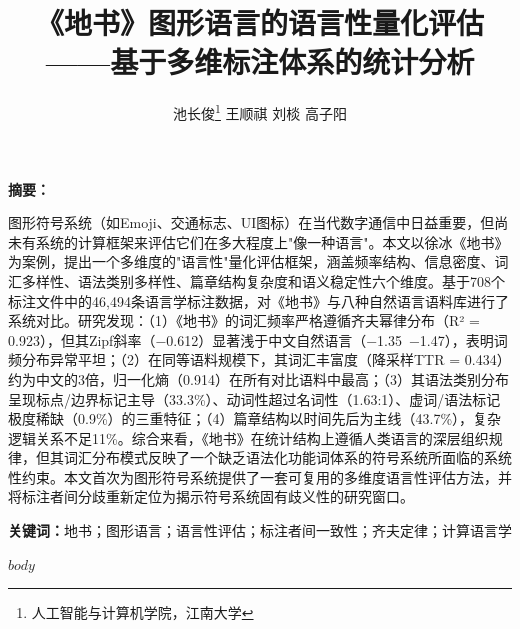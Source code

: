 \documentclass[12pt,a4paper,UTF8]{ctexart}
\title{\textbf{《地书》图形语言的语言性量化评估\\——基于多维标注体系的统计分析}}
\author{池长俊\thanks{人工智能与计算机学院，江南大学} \quad 王顺祺 \quad 刘棪 \quad 高子阳}
\date{}
\newenvironment{chineseabstract}{%
  \begin{center}
    \begin{minipage}{0.9\textwidth}
      \small
      \textbf{摘\quad 要：}
}{%
    \end{minipage}
  \end{center}
  \vspace{0.5em}
}
\newcommand{\keywords}[1]{%
  \begin{center}
    \begin{minipage}{0.9\textwidth}
      \small
      \textbf{关键词：}#1
    \end{minipage}
  \end{center}
}
\begin{document}
\maketitle

\begin{chineseabstract}
图形符号系统（如Emoji、交通标志、UI图标）在当代数字通信中日益重要，但尚未有系统的计算框架来评估它们在多大程度上"像一种语言"。本文以徐冰《地书》为案例，提出一个多维度的"语言性"量化评估框架，涵盖频率结构、信息密度、词汇多样性、语法类别多样性、篇章结构复杂度和语义稳定性六个维度。基于708个标注文件中的46,494条语言学标注数据，对《地书》与八种自然语言语料库进行了系统对比。研究发现：（1）《地书》的词汇频率严格遵循齐夫幂律分布（R² = 0.923），但其Zipf斜率（−0.612）显著浅于中文自然语言（−1.35~−1.47），表明词频分布异常平坦；（2）在同等语料规模下，其词汇丰富度（降采样TTR = 0.434）约为中文的3倍，归一化熵（0.914）在所有对比语料中最高；（3）其语法类别分布呈现标点/边界标记主导（33.3\%）、动词性超过名词性（1.63:1）、虚词/语法标记极度稀缺（0.9\%）的三重特征；（4）篇章结构以时间先后为主线（43.7\%），复杂逻辑关系不足11\%。综合来看，《地书》在统计结构上遵循人类语言的深层组织规律，但其词汇分布模式反映了一个缺乏语法化功能词体系的符号系统所面临的系统性约束。本文首次为图形符号系统提供了一套可复用的多维度语言性评估方法，并将标注者间分歧重新定位为揭示符号系统固有歧义性的研究窗口。
\end{chineseabstract}

\keywords{地书；图形语言；语言性评估；标注者间一致性；齐夫定律；计算语言学}

\newpage

$body$
\end{document}
